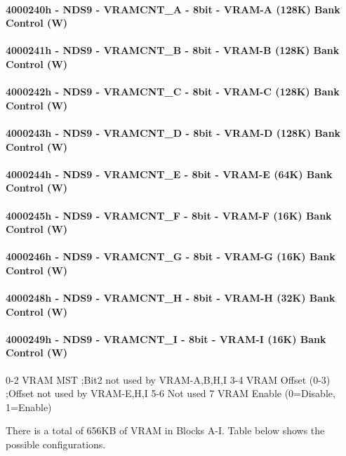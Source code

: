 \documentclass[11pt,a4paper]{proc}
\begin{document}
\begin{flushleft}
\paragraph{4000240h - NDS9 - VRAMCNT\_A - 8bit - VRAM-A (128K) Bank Control (W)}
\paragraph{4000241h - NDS9 - VRAMCNT\_B - 8bit - VRAM-B (128K) Bank Control (W)}
\paragraph{4000242h - NDS9 - VRAMCNT\_C - 8bit - VRAM-C (128K) Bank Control (W)}
\paragraph{4000243h - NDS9 - VRAMCNT\_D - 8bit - VRAM-D (128K) Bank Control (W)}
\paragraph{4000244h - NDS9 - VRAMCNT\_E - 8bit - VRAM-E (64K) Bank Control (W)}
\paragraph{4000245h - NDS9 - VRAMCNT\_F - 8bit - VRAM-F (16K) Bank Control (W)}
\paragraph{4000246h - NDS9 - VRAMCNT\_G - 8bit - VRAM-G (16K) Bank Control (W)}
\paragraph{4000248h - NDS9 - VRAMCNT\_H - 8bit - VRAM-H (32K) Bank Control (W)}
\paragraph{4000249h - NDS9 - VRAMCNT\_I - 8bit - VRAM-I (16K) Bank Control (W)}

  0-2   VRAM MST              ;Bit2 not used by VRAM-A,B,H,I
  3-4   VRAM Offset (0-3)     ;Offset not used by VRAM-E,H,I
  5-6   Not used
  7     VRAM Enable (0=Disable, 1=Enable)

There is a total of 656KB of VRAM in Blocks A-I.
Table below shows the possible configurations.


\end{flushleft}
\end{document}
